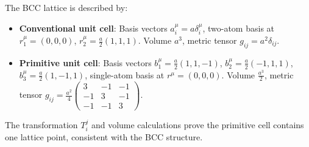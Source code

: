 \documentclass[a4paper,12pt]{article}
\newcommand{\delt}{\delta} %
\begin{document}
	The BCC lattice is described by:
	
	\begin{itemize}
		\item \textbf{Conventional unit cell}: Basis vectors \(a_i^\mu = a \delt_i^\mu\), two-atom basis at \(r_1^\mu = (0, 0, 0)\), \(r_2^\mu = \frac{a}{2} (1, 1, 1)\). Volume \(a^3\), metric tensor \(g_{ij} = a^2 \delt_{ij}\).
		\item \textbf{Primitive unit cell}: Basis vectors \(b_1^\mu = \frac{a}{2} (1, 1, -1)\), \(b_2^\mu = \frac{a}{2} (-1, 1, 1)\), \(b_3^\mu = \frac{a}{2} (1, -1, 1)\), single-atom basis at \(r^\mu = (0, 0, 0)\). Volume \(\frac{a^3}{2}\), metric tensor \(g_{ij} = \frac{a^2}{4} \begin{pmatrix} 3 & -1 & -1 \\ -1 & 3 & -1 \\ -1 & -1 & 3 \end{pmatrix}\).
	\end{itemize}
	
	The transformation \(T_i^j\) and volume calculations prove the primitive cell contains one lattice point, consistent with the BCC structure.
	
\end{document}
